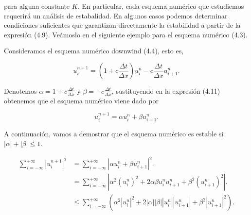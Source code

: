 para alguna constante $K$.
En particular, cada esquema numérico que estudiemos requerirá
un análisis de estabalidad. En algunos casos podemos determinar
condiciones suficientes que garantizan directamente la estabilidad a
partir de la expresión (4.9).
Veámoslo en el siguiente ejemplo para el esquema numérico (4.3).

\begin{example}
  Consideramos el esquema numérico downwind (4.4), esto es,

  \begin{equation*}
    u^{n+1}_{i}=
    \left(
    1+
    c\frac{\Delta t}{\Delta x}
    \right)
    u^{n}_{i}-
    c\frac{\Delta t}{\Delta x}
    u^{n}_{i+1}.
  \end{equation*}

  Denotemos
  \begin{math}
    \alpha=
    1+
    c\frac{\Delta t}{\Delta x}
  \end{math}
  y
  \begin{math}
    \beta=
    -c\frac{\Delta t}{\Delta x}
  \end{math},
  sustituyendo en la expresión (4.11) obtenemos que el esquema
  numérico viene dado por

  \begin{equation*}
    u^{n+1}_{i}=
    \alpha u^{n}_{i}+
    \beta u^{n}_{i+1}.
  \end{equation*}

  A continuación, vamos a demostrar que el esquema numérico es
  estable si
  \begin{math}
    \left|\alpha\right|+
    \left|\beta\right|\leq
    1
  \end{math}.

  \begin{align*}
    \sum_{i=-\infty}^{+\infty}
    {\left|u^{n+1}_{i}\right|}^{2} & =
    \sum_{i=-\infty}^{+\infty}
    {
    \left|\alpha u^{n}_{i}+
    \beta u^{n}_{i+1}\right|
    }^{2}.                                \\
                                   & =
    \sum_{i=-\infty}^{+\infty}
    \left|
    \alpha^{2}
    {\left(u^{n}_{i}\right)}^{2}+
    2\alpha\beta
    u^{n}_{i}
    u^{n}_{i+1}+
    \beta^{2}
    {\left(u^{n}_{i+1}\right)}^{2}
    \right|.                              \\
                                   & \leq
    \sum_{i=-\infty}^{+\infty}
    \left(
    \alpha^{2}
    {\left|u^{n}_{i}\right|}^{2}+
    2\left|\alpha\right|
    \left|\beta\right|
    \left|u^{n}_{i}\right|
    \left|u^{n}_{i+1}\right|+
    \beta^{2}
    {\left|u^{n}_{i+1}\right|}^{2}
    \right).
  \end{align*}


\end{example}
